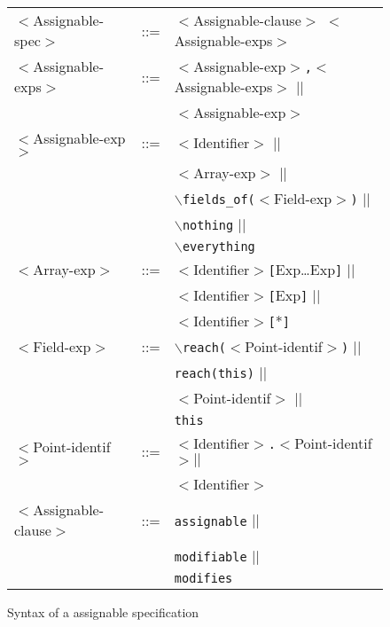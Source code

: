\documentclass[a4paper]{llncs}
\newcommand{\jml}{\textsc{Jml}}
\newcommand{\java}{\textsc{Java}}
\begin{document}
\begin{figure}[hbt]
\begin{tabular}{lll}
$<$\textsf{Assignable-spec}$>$ &::= &$<$\textsf{Assignable-clause}$>$ $<$\textsf{Assignable-exps}$>$ \\
$<$\textsf{Assignable-exps}$>$ &::= &$<$\textsf{Assignable-exp}$>$\texttt{,}$<$\textsf{Assignable-exps}$>$ $|| $\\
                           &    &$<$\textsf{Assignable-exp}$>$ \\
$<$\textsf{Assignable-exp}$>$  &::= &$<$\textsf{Identifier}$>$ $||$ \\
                           &    &$<$\textsf{Array-exp}$>$  $||$ \\
                           &  &$\backslash$\texttt{fields\_of(}$<$\textsf{Field-exp}$>$\texttt{)} $||$ \\
                           &  &$\backslash$\texttt{nothing} $||$\\
                           &  &$\backslash$\texttt{everything} \\
$<$\textsf{Array-exp}$>$      &::=  &$<$\textsf{Identifier}$>$\texttt{[}\textsf{Exp}\ldots \textsf{Exp}\texttt{]} $||$ \\
                           &  &$<$\textsf{Identifier}$>$\texttt{[}\textsf{Exp}\texttt{]} $||$ \\
                           &  &$<$\textsf{Identifier}$>$\texttt{[}*\texttt{]} \\
$<$\textsf{Field-exp}$>$      &::=  &$\backslash$\texttt{reach(}$<$\textsf{Point-identif}$>$\texttt{)} $||$ \\
                           &     &\texttt{reach(}\texttt{this}\texttt{)} $||$ \\
                           &     &$<$\textsf{Point-identif}$>$ $||$ \\
                           &     &\texttt{this} \\
$<$\textsf{Point-identif}$>$   &::=  &$<$\textsf{Identifier}$>$\texttt{.}$<$\textsf{Point-identif}$> $$||$ \\
                           &     &$<$\textsf{Identifier}$>$ \\
$<$\textsf{Assignable-clause}$>$ &::= &\texttt{assignable} $||$  \\
                             &    &\texttt{modifiable} $||$  \\
                             &    &\texttt{modifies} \\
\end{tabular}
\label{fig-syn-mod-spe}
\caption{Syntax of a assignable specification}
\end{figure}
\end{document}
